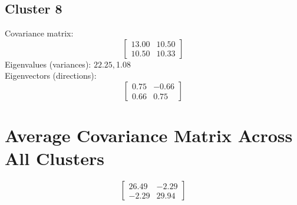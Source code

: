 \documentclass{article}
\begin{document}
\subsection*{Cluster 8}
Covariance matrix:
\[\begin{bmatrix}13.00 & 10.50 \\10.50 & 10.33\end{bmatrix}\]
Eigenvalues (variances): $ 22.25, $1.08\\
Eigenvectors (directions):
\[\begin{bmatrix}0.75 & -0.66 \\0.66 & 0.75\end{bmatrix}\]
\section*{Average Covariance Matrix Across All Clusters}
\[\begin{bmatrix}26.49 & -2.29 \\-2.29 & 29.94\end{bmatrix}\]
\end{document}
